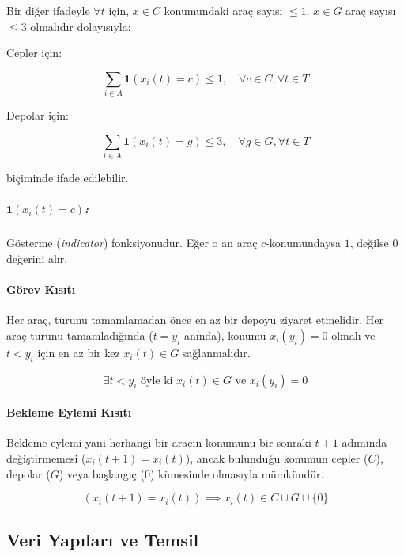 Bir diğer ifadeyle $\forall t$ için, $x \in C$ konumundaki araç sayısı $\le 1$. $x \in G$ araç sayısı $\le 3$ olmalıdır dolayısıyla:

Cepler için:

\begin{equation}
    \sum_{i \in A} \mathbf{1}(x_i(t) = c) \le 1, \quad \forall c \in C, \forall t \in T
\end{equation}

Depolar için:

\begin{equation}
    \sum_{i \in A} \mathbf{1}(x_i(t) = g) \le 3, \quad \forall g \in G, \forall t \in T
\end{equation}

biçiminde ifade edilebilir.

\subparagraph{$\mathbf{1}(x_i(t) = c)$:} Gösterme (\textit{indicator}) fonksiyonudur. Eğer o an araç $c$-konumundaysa $1$, değilse $0$ değerini alır.
 
\paragraph{Görev Kısıtı} Her araç, turunu tamamlamadan önce en az bir depoyu ziyaret etmelidir. Her araç turunu tamamladığında ($t = y_i$ anında), konumu $x_i(y_i) = 0$ olmalı ve $t < y_i$ için en az bir kez $x_i(t) \in G$ sağlanmalıdır.

\begin{equation}
    \exists t < y_i \text{ öyle ki } x_i(t) \in G \text{ ve } x_i(y_i) = 0
\end{equation}

\paragraph{Bekleme Eylemi Kısıtı} Bekleme eylemi yani herhangi bir aracın konumunu bir sonraki $t+1$ adımında değiştirmemesi ($x_i(t+1) = x_i(t)$), ancak bulunduğu konumun cepler ($C$), depolar ($G$) veya başlangıç ($0$) kümesinde olmasıyla mümkündür.

\begin{equation}
    (x_i(t+1) = x_i(t)) \implies x_i(t) \in C \cup G \cup \{0\}
\end{equation}


\subsection{Veri Yapıları ve Temsil}


